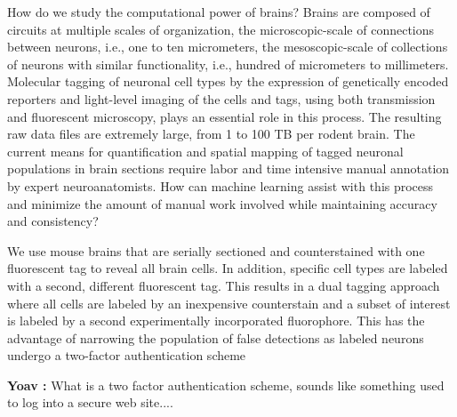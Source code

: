 \documentclass[11pt]{article}
\newcommand{\comment}[3]{{\color{#1} {\bf #2 :} #3}}
\newcommand{\yoav}[1]{\comment{purple}{Yoav}{#1}}
\begin{document}
How do we study the computational power of brains? Brains are composed
of circuits at multiple scales of organization, the
microscopic-scale of connections between neurons, i.e., one to ten
micrometers, the mesoscopic-scale of collections of neurons with
similar functionality, i.e., hundred of micrometers to
millimeters. Molecular tagging of neuronal cell types by the
expression of genetically encoded reporters and light-level imaging of
the cells and tags, using both transmission and fluorescent
microscopy, plays an essential role in this process. The resulting raw
data files are extremely large, from 1 to 100 TB per rodent brain. The
current means for quantification and spatial mapping of tagged
neuronal populations in brain sections require labor and time intensive
manual annotation by expert neuroanatomists. How can machine learning assist
with this process and minimize the amount of manual work involved
while maintaining accuracy and consistency?

We use mouse brains that are serially sectioned and counterstained
with one fluorescent tag to reveal all brain cells.  In addition,
specific cell types are labeled with a second, different fluorescent
tag. This results in a dual tagging approach where all cells are
labeled by an inexpensive counterstain and a subset of interest is
labeled by a second experimentally incorporated fluorophore. This has
the advantage of narrowing the population of false detections as
labeled neurons undergo a two-factor authentication scheme

\yoav{What is a two factor authentication scheme, sounds like
  something used to log into a secure web site....}

\end{document}
